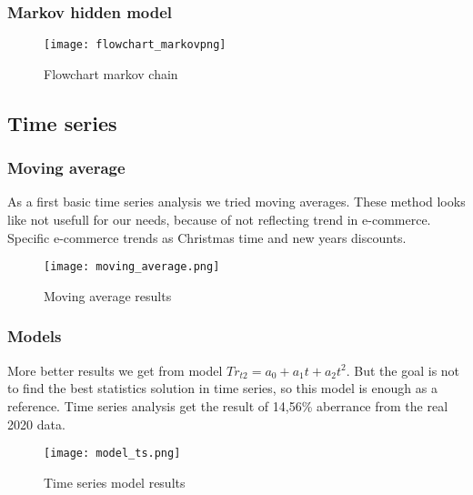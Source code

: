 \subsubsection{Markov hidden model}
\begin{figure}[h!]
    \begin{center}
        \texttt{[image: flowchart\_markovpng]}
    \end{center}
    \caption{Flowchart markov chain}
    \label{flowchart_markov}
\end{figure}
\newpage
\subsection{Time series}
\subsubsection{Moving average}
As a first basic time series analysis we tried moving averages. These method looks like not usefull for our needs,
because of not reflecting trend in e-commerce. Specific e-commerce trends as Christmas time and new years discounts.
\begin{figure}[h!]
    \begin{center}
        \texttt{[image: moving\_average.png]}
    \end{center}
    \caption{Moving average results}
    \label{Time series moving average}
\end{figure}
\newpage
\subsubsection{Models}
More better results we get from model $Tr_{t2}=a_0+a_1t+a_2t^2$. But the goal is not to find the best
statistics solution in time series, so this model is enough as a reference. Time series analysis get the
result of 14,56\% aberrance from the real 2020 data.
\begin{figure}[h!]
    \begin{center}
        \texttt{[image: model\_ts.png]}
    \end{center}
    \caption{Time series model results}
    \label{Time series model's}
\end{figure}
